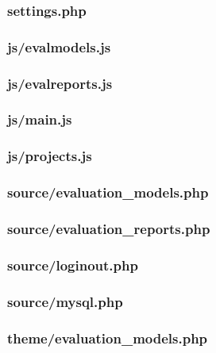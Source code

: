 \documentclass[12pt,a4paper,spanish,twoside]{article}
\begin{document}
\subsubsection{settings.php}


\subsubsection{js/evalmodels.js}


\subsubsection{js/evalreports.js}


\subsubsection{js/main.js}


\subsubsection{js/projects.js}


\subsubsection{source/evaluation\_models.php}


\subsubsection{source/evaluation\_reports.php}


\subsubsection{source/loginout.php}


\subsubsection{source/mysql.php}


\subsubsection{theme/evaluation\_models.php}

\end{document}
